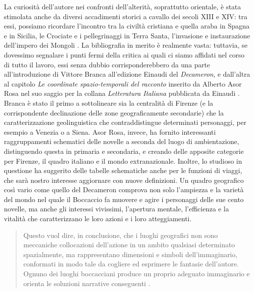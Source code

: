 La curiosità dell'autore nei confronti dell'alterità, soprattutto
orientale, è stata stimolata anche da diversi accadimenti storici a
cavallo dei secoli XIII e XIV: tra essi, possiamo ricordare l'incontro
tra la civiltà cristiana e quella araba in Spagna e in Sicilia, le
Crociate e i pellegrinaggi in Terra Santa, l'invasione e instaurazione
dell'impero dei Mongoli \autocite[p.~20]{morosini2010boccaccio}. La
bibliografia in merito è realmente vasta: tuttavia, se dovessimo
segnalare i punti fermi della critica ai quali ci siamo affidati nel
corso di tutto il lavoro, essi senza dubbio corrisponderebbero da una
parte all'introduzione di Vittore Branca all'edizione Einaudi del
\emph{Decameron}, e dall'altra al capitolo \emph{Le coordinate
spazio-temporali del racconto} inserito da Alberto Asor Rosa nel suo
saggio per la collana \emph{Letteratura Italiana} pubblicata da Einaudi
\autocite{asor1992}. Branca è stato il primo a sottolineare sia la
centralità di Firenze (e la corrispondente declinazione delle zone
geograficamente secondarie) che la caratterizzazione geolinguistica che
contraddistingue determinati personaggi, per esempio a Venezia o a
Siena. Asor Rosa, invece, ha fornito interessanti raggruppamenti
schematici delle novelle a seconda del luogo di ambientazione,
distinguendo questa in primaria e secondaria, e creando delle apposite
categorie per Firenze, il quadro italiano e il mondo extranazionale.
Inoltre, lo studioso in questione ha suggerito delle tabelle schematiche
anche per le funzioni di viaggi, che sarà nostro interesse aggiornare
con nuove definizioni. Un quadro geografico così vario come quello del
Decameron comprova non solo l'ampiezza e la varietà del mondo nel quale
il Boccaccio fa muovere e agire i personaggi delle sue cento novelle, ma
anche gli interessi vivissimi, l'apertura mentale, l'efficienza e la
vitalità che caratterizzano le loro azioni e i loro atteggiamenti.

\begin{quote}
Questo vuol dire, in conclusione, che i luoghi geografici non sono
meccaniche collocazioni dell'azione in un ambito qualsiasi determinato
spazialmente, ma rappresentano dimensioni e simboli dell'immaginario,
conformati in modo tale da cogliere ed esprimere le fantasie
dell'autore. Ognuno dei luoghi boccacciani produce un proprio adeguato
immaginario e orienta le soluzioni narrative conseguenti
\autocite[p.~548]{asor1992}.
\end{quote}


